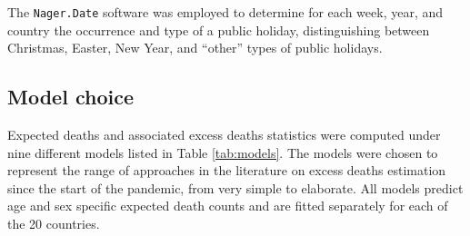 \documentclass[10pt,letterpaper]{article}
\begin{document}

The \texttt{Nager.Date} software \cite{Hager2021} was employed to determine for each week, year, and country the occurrence and type of a public holiday, distinguishing between Christmas, Easter, New Year, and ``other'' types of public holidays.

\subsection*{Model choice}

Expected deaths and associated excess deaths statistics were computed under nine different models listed in Table \ref{tab:models}. The models were chosen to represent the range of approaches in the literature on excess deaths estimation since the start of the pandemic, from very simple to elaborate. All models predict age and sex specific expected death counts and are fitted separately for each of the 20 countries.
\end{document}
